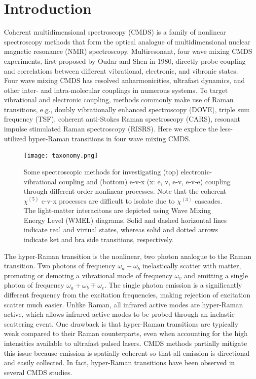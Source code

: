 \documentclass[aip, jcp, reprint, onecolumn]{revtex4-2}
\begin{document}
\section{Introduction}
Coherent multidimensional spectroscopy (CMDS) is a family of nonlinear spectroscopy methods that form the optical analogue of multidimensional nuclear magnetic resonance (NMR) spectroscopy.\cite{Cho2008}
Multiresonant, four wave mixing CMDS experiments, first proposed by Oudar and Shen in 1980,\cite{RN307} directly probe coupling and correlations between different vibrational, electronic, and vibronic states. \cite{RN281, RN103, Cho2008} 
Four wave mixing CMDS has resolved anharmonicities, ultrafast dynamics, and other inter- and intra-molecular couplings in numerous systems. \cite{Cho2008, Gaynor2017, Ziegler2018, Ogilvie2019, Bonn2021, RN325, Chen2024}
To target vibrational and electronic coupling, methods commonly make use of Raman transitions, e.g., doubly vibrationally enhanced spectroscopy (DOVE), triple sum frequency (TSF), coherent anti-Stokes Raman spectroscopy (CARS), resonant impulse stimulated Raman spectroscopy (RISRS).\cite{RN103, Dhar1994, RN345, Cho2000, RN491}
Here we explore the less-utilized hyper-Raman transitions in four wave mixing CMDS.

\begin{figure}[!htbp]
	\centering
	\texttt{[image: taxonomy.png]}
	\caption{
		Some spectroscopic methods for investigating (top) electronic-vibrational coupling and (bottom) e-v-x (x: e, v, e-v, e-v-e) coupling through different order nonlinear processes.
		Note that the coherent $\chi^{(5)}$ e-v-x processes are difficult to isolate due to $\chi^{(3)}$ cascades. 
		The light-matter interacitons are depicted using Wave Mixing Energy Level (WMEL) diagrams.\cite{RN286}
		Solid and dashed horizontal lines indicate real and virtual states, whereas solid and dotted arrows indicate ket and bra side transitions, respectively. 
	}
	\label{fig:comparisonwmel}
\end{figure}

The hyper-Raman transition is the nonlinear, two photon analogue to the Raman transition.\cite{Terhune1965, Cyvin1965, Andrews1978}
Two photons of frequency $\omega_a+\omega_b$ inelastically scatter with matter, promoting or demoting a vibrational mode of frequency $\omega_v$ and emitting a single photon of frequency $\omega_a + \omega_b \mp \omega_v$. 
The single photon emission is a significantly different frequency from the excitation frequencies, making rejection of excitation scatter much easier.
Unlike Raman, all infrared active modes are hyper-Raman active, which allows infrared active modes to be probed through an inelastic scattering event. \cite{Andrews1978}
One drawback is that hyper-Raman transitions are typically weak compared to their Raman counterparts, even when accounting for the high intensities available to ultrafast pulsed lasers.\cite{RN515, Kelley2010}
CMDS methods partially mitigate this issue because emission is spatially coherent so that all emission is directional and easily collected.
In fact, hyper-Raman transitions have been observed in several CMDS studies.\cite{Zilian1994, RN350, RN416, RN351, RN352, RN353, Chen1998, RN362, RN418, Wang2021, Bonn2024, McDonnell2024}
\end{document}
